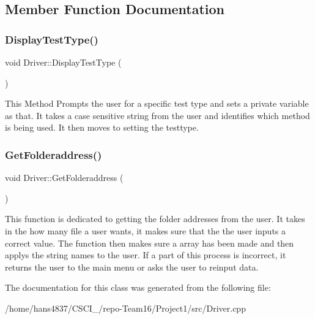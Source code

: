 \subsection{Member Function Documentation}
\mbox{\label{classDriver_afa66a3ba1778ac080ad30b07f7915daa}} 
\subsubsection{\texorpdfstring{Display\+Test\+Type()}{DisplayTestType()}}
{\footnotesize\ttfamily void Driver\+::\+Display\+Test\+Type (\begin{DoxyParamCaption}{ }\end{DoxyParamCaption})\hspace{0.3cm}{\ttfamily [inline]}}

This Method Prompts the user for a specific test type and sets a private variable as that. It takes a case sensitive string from the user and identifies which method is being used. It then moves to setting the testtype. \mbox{\label{classDriver_a2cd4795b0b07b4018f7c0d4c5d274fa5}} 
\subsubsection{\texorpdfstring{Get\+Folderaddress()}{GetFolderaddress()}}
{\footnotesize\ttfamily void Driver\+::\+Get\+Folderaddress (\begin{DoxyParamCaption}{ }\end{DoxyParamCaption})\hspace{0.3cm}{\ttfamily [inline]}}

This function is dedicated to getting the folder addresses from the user. It takes in the how many file a user wants, it makes sure that the the user inputs a correct value. The function then makes sure a array has been made and then applys the string names to the user. If a part of this process is incorrect, it returns the user to the main menu or asks the user to reinput data. 

The documentation for this class was generated from the following file\+:\begin{DoxyCompactItemize}
\item 
/home/hans4837/\+C\+S\+C\+I\+\_/repo-\/\+Team16/\+Project1/src/Driver.\+cpp\end{DoxyCompactItemize}

